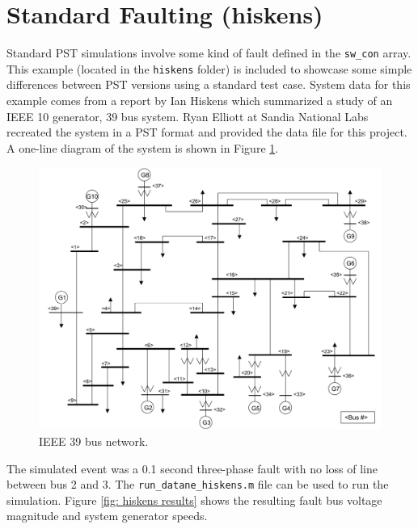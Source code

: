\pagebreak
\section{Standard Faulting (hiskens)} \label{ex: hiskens}
Standard PST simulations involve some kind of fault defined in the \verb|sw_con| array.
This example (located in the \verb|hiskens| folder) is included to showcase some simple differences between PST versions using a standard test case.
System data for this example comes from a report by Ian Hiskens \cite{hiskens2013} which summarized a study of an IEEE 10 generator, 39 bus system.
Ryan Elliott at Sandia National Labs recreated the system in a PST format and provided the data file for this project.
A one-line diagram of the system is shown in Figure \ref{fig: hiskens oneline}.

\begin{figure}[H]
	\centering
	\footnotesize
	\includegraphics[width=.85\linewidth]{figures/hiskens/hiskensOneline}
	\caption{IEEE 39 bus network.}
	\label{fig: hiskens oneline}
\end{figure}%

The simulated event was a 0.1 second three-phase fault with no loss of line between bus 2 and 3.
The \verb|run_datane_hiskens.m| file can be used to run the simulation.
Figure \ref{fig: hiskens results} shows the resulting fault bus voltage magnitude and system generator speeds.

